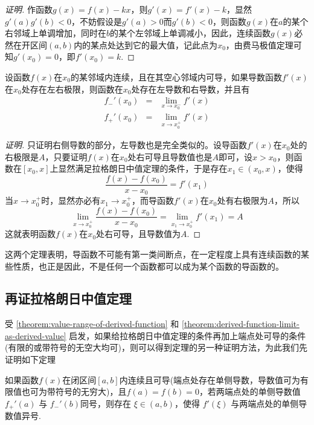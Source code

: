 \begin{proof}[证明]
  作函数$g(x)=f(x)-kx$，则$g'(x)=f'(x)-k$，显然$g'(a)g'(b)<0$，不妨假设是$g'(a)>0$而$g'(b)<0$，则函数$g(x)$在$a$的某个右邻域上单调增加，同时在$b$的某个左邻域上单调减小，因此，连续函数$g(x)$必然在开区间$(a,b)$内的某点处达到它的最大值，记此点为$x_0$，由费马极值定理可知$g'(x_0)=0$，即$f'(x_0)=k$.
\end{proof}

\begin{theorem}
  \label{theorem:derived-function-limit-as-derived-value}
  设函数$f(x)$在$x_0$的某邻域内连续，且在其空心邻域内可导，如果导数函数$f'(x)$在$x_0$处存在左右极限，则函数在$x_0$处存在左导数和右导数，并且有
  \begin{eqnarray*}
   f_-'(x_0) & = & \lim_{x \to x_0^-} f'(x)  \\
   f_+'(x_0) & = & \lim_{x \to x_0^+} f'(x) 
  \end{eqnarray*}
\end{theorem}

\begin{proof}[证明]
  只证明右侧导数的部分，左导数也是完全类似的。设导函数$f'(x)$在$x_0$处的右极限是$A$，只要证明$f(x)$在$x_0$处右可导且导数值也是$A$即可，设$x>x_0$，则函数在$[x_0,x]$上显然满足拉格朗日中值定理的条件，于是存在$x_1 \in (x_0,x)$，使得
  \[ \frac{f(x)-f(x_0)}{x-x_0} = f'(x_1) \]
  当$x \to x_0^+$时，显然亦必有$x_1 \to x_0^+$，而导函数$f'(x)$在$x_0$处有右极限为$A$，所以
  \[ \lim_{x \to x_0^+} \frac{f(x)-f(x_0)}{x-x_0} = \lim_{x_1 \to x_0^+} f'(x_1) = A \]
  这就表明函数$f(x)$在$x_0$处右可导，且导数值为$A$.
\end{proof}

这两个定理表明，导函数不可能有第一类间断点，在一定程度上具有连续函数的某些性质，也正是因此，不是任何一个函数都可以成为某个函数的导函数的。

\subsection{再证拉格朗日中值定理}
\label{sec:second-proof-for-lagrange-middle-value-theorem}

 受 \autoref{theorem:value-range-of-derived-function} 和 \autoref{theorem:derived-function-limit-as-derived-value} 启发，如果给拉格朗日中值定理的条件再加上端点处可导的条件(有限的或带符号的无空大均可)，则可以得到定理的另一种证明方法，为此我们先证明如下定理
\begin{theorem}
  如果函数$f(x)$在闭区间$[a,b]$内连续且可导(端点处存在单侧导数，导数值可为有限值也可为带符号的无穷大)，且$f(a)=f(b)=0$，若两端点处的单侧导数值$f_{+}'(a)$ 与 $f_-'(b)$同号，则存在 $\xi \in (a,b)$，使得 $f'(\xi)$ 与两端点处的单侧导数值异号. 
\end{theorem}

